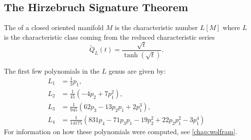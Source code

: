 %
%
\subsection{The Hirzebruch Signature Theorem}

\begin{definition}
	The  of a closed oriented manifold $M$ is the characteristic number $L[M]$ where $L$ is the characteristic class coming from the reduced characteristic series
	\[
		\widetilde{Q}_{L}(t) = \frac{\sqrt{t}}{\tanh(\sqrt{t})}.
	\]
\end{definition}

\begin{example}\label{example:L-genus}
	The first few polynomials in the $L$ genus are given by:
\[
	\begin{aligned}
		L_1 &= \frac{1}{3}p_1,\\
		L_2 &= \frac{1}{45}(-4p_2 + 7p_1^2),\\
		L_3 &= \frac{1}{945}(62p_3-13p_2p_1+2p_1^3),\\
		L_4 &= \frac{1}{14175}(831p_4-71p_3p_1-19p_2^2 + 22p_2p_1^2 - 3p_1^4)
	\end{aligned}
\]
	For information on how these polynomials were computed, see \cref{chap:wolfram}.
\end{example}

